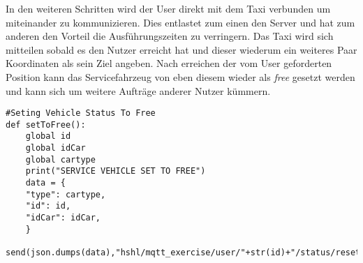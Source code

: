 In den weiteren Schritten wird der User direkt mit dem Taxi verbunden um miteinander zu kommunizieren. Dies entlastet zum einen den Server und hat zum anderen den Vorteil die Ausführungszeiten zu verringern. Das Taxi wird sich mitteilen sobald es den Nutzer erreicht hat und dieser wiederum ein weiteres Paar Koordinaten als sein Ziel angeben. Nach erreichen der vom User geforderten Position kann das Servicefahrzeug von eben diesem wieder als \textit{free} gesetzt werden und kann sich um weitere Aufträge anderer Nutzer kümmern.

\begin{lstlisting}
#Seting Vehicle Status To Free
def setToFree():
    global id
    global idCar
    global cartype
    print("SERVICE VEHICLE SET TO FREE")
    data = {
    "type": cartype,
    "id": id,
    "idCar": idCar,
    }
    send(json.dumps(data),"hshl/mqtt_exercise/user/"+str(id)+"/status/reset")
\end{lstlisting}

